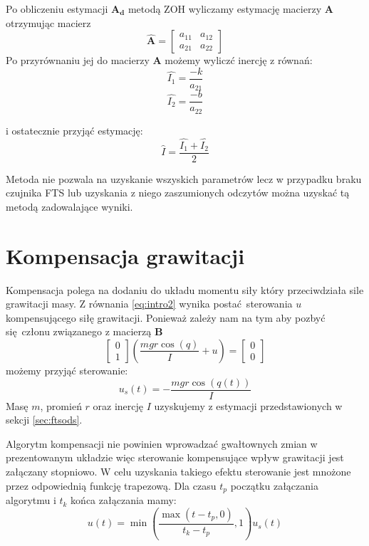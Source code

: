 \documentclass[a4paper, 10pt]{article}
\begin{document}
Po obliczeniu estymacji $\mathbf{A_d}$ metodą ZOH wyliczamy estymację macierzy $\mathbf{A}$ otrzymując macierz
\begin{equation}
\mathbf{\hat{A}} = 	\begin{bmatrix}
a_{11} & a_{12}\\
a_{21} & a_{22}
\end{bmatrix}
\end{equation}
Po przyrównaniu jej do macierzy $\mathbf{A}$ możemy wyliczć inercję z równań:
\begin{equation}
\hat{I_1} = \frac{-k}{a_{21}}
\end{equation}
\begin{equation}
\hat{I_2} = \frac{-b}{a_{22}}
\end{equation}

i ostatecznie przyjąć estymację:
\begin{equation}
\hat{I} = \frac{\hat{I_1}+\hat{I_2}}{2}
\end{equation}


Metoda nie pozwala na uzyskanie wszyskich parametrów lecz w przypadku braku czujnika FTS lub uzyskania z niego zaszumionych odczytów można uzyskać tą metodą zadowalające wyniki.

\section{Kompensacja grawitacji}
Kompensacja polega na dodaniu do układu momentu siły który przeciwdziała sile grawitacji masy. Z równania \ref{eq:intro2} wynika postać sterowania $u$ kompensującego siłę grawitacji. Ponieważ zależy nam na tym aby pozbyć się członu związanego z macierzą $\mathbf{B}$
\begin{equation}
	\begin{bmatrix}
	0 \\
	1
	\end{bmatrix}
	(\frac{mgr\cos{(q)}}{I} + u) = 	\begin{bmatrix}
	0 \\
	0
	\end{bmatrix}
\end{equation}
możemy przyjąć sterowanie:
\begin{equation}
u_s(t) = -\frac{mgr\cos{(q(t))}}{I}
\end{equation}
Masę $m$, promień $r$ oraz inercję $I$ uzyskujemy z estymacji przedstawionych w sekcji \ref{sec:ftsods}.


Algorytm kompensacji nie powinien wprowadzać gwałtownych zmian w prezentowanym układzie więc sterowanie kompensujące wpływ grawitacji jest załączany stopniowo. W celu uzyskania takiego efektu sterowanie jest mnożone przez odpowiednią funkcję trapezową. Dla czasu $t_p$ początku załączania algorytmu i $t_k$ końca załączania mamy:
\begin{equation}
u(t) = \min{(\frac{\max{( t - t_p, 0)}}{t_k-t_p}, 1)}u_s(t)
\end{equation}
\end{document}
